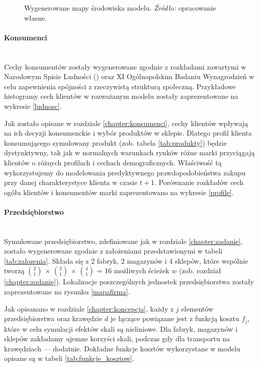 \documentclass[polish, twoside, 12pt, a4paper]{article}
\theoremstyle{definition}
\theoremstyle{plain}
\theoremstyle{remark}
\begin{document}
\begin{figure}[hbt]
  \captionsetup{margin=10pt,font=small,labelfont=bf,width=.8\textwidth}

  \caption[Wygenerowane mapy środowiska modelu ]{Wygenerowane mapy środowiska modelu. \textit{Źródło:} opracowanie własne.}\label{fig:generowanemapy}
\end{figure}

\paragraph{Konsumenci}\mbox{}\\
Cechy konsumentów zostały wygenerowane zgodnie z rozkładami zawartymi w Narodowym Spisie Ludności (\cite{GUS2011}) oraz XI Ogólnopolskim Badaniu Wynagrodzień \cite{Sedlak2013} w celu zapewnienia spójności z rzeczywistą strukturą społeczną. Przykładowe histogramy cech klientów w rozważanym modelu zostały zaprezentowane na wykresie \ref{ludnosc}. 

Jak zostało opisane w rozdziale \ref{chapter:konsumenci}, cechy klientów wpływają na ich decyzji konsumenckie i wybór produktów w sklepie. Dlatego profil klienta konsumującego symulowany produkt (zob. tabela \ref{tab:produkty}) będzie dystynktywny, tak jak w normalnych warunkach rynków różne marki przyciągają klientów o różnych profilach i cechach demograficznych. Właściwość tą wykorzystujemy do modelowania predyktywnego prawdopodobieństwa zakupu przy danej charakterystyce klienta w czasie $t+1$. Porównanie rozkładów cech ogółu klientów i konsumentów marki zaprezentowano na wykresie \ref{profile}.



\paragraph{Przedsiębiorstwo}\mbox{}\\
Symulowane przedsiębiorstwo, zdefiniowane jak w rozdziale \ref{chapter:zadanie}, zostało wygenerowane zgodnie z założeniami przedstawionymi w tabeli \ref{tab:zalozenia}. Składa się z 2 fabryk, 2 magazynów i 4 sklepów, które wspólnie tworzą  $2\choose 1 $ $ \times $ $2\choose 1 $ $ \times $ $4\choose 1 $ = 16 możliwych ścieżek $w$ (zob. rozdział \ref{chapter:zadanie}). Lokalizacje poszczególnych jednostek przedsiębiorstwa zostały zaprezentowane na rysunku \ref{mapafirma}.

Jak opisanano w rozdziale \ref{chapter:koncepcja}, każdy z $j$ elementów przedsiębiorstwa oraz krawędzie $d$ je łączące powiązane jest z funkcją kosztu $f_j$, które w celu symulacji efektów skali są nieliniowe. Dla fabryk, magazynów i sklepów zakładamy ujemne korzyści skali, podczas gdy dla transportu na krawędziach --- dodatnie. Dokładne funkcje kosztów wykorzystane w modelu opisane są w tabeli \ref{tab:funkcje_kosztow}. 
\end{document}
